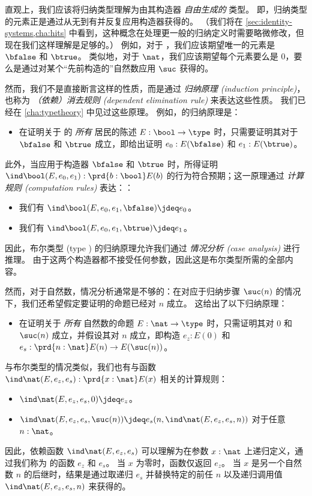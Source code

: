 %
直观上，我们应该将归纳类型理解为由其构造器 \emph{自由生成的} 类型。
即，归纳类型的元素正是通过从无到有并反复应用构造器获得的。
（我们将在 \cref{sec:identity-systems,cha:hits} 中看到，这种概念在处理更一般的归纳定义时需要略微修改，但现在我们这样理解是足够的。）
例如，对于 \bool，我们应该期望唯一的元素是 $\bfalse$ 和 $\btrue$。
类似地，对于 $\nat$，我们应该期望每个元素要么是 $0$，要么是通过对某个“先前构造的”自然数应用 $\suc$ 获得的。

%
然而，我们不是直接断言这样的性质，而是通过 \emph{归纳原理 (induction principle)}，也称为 \emph{（依赖）消去规则 (dependent elimination rule)} 来表达这些性质。
我们已经在 \cref{cha:typetheory} 中见过这些原理。
例如，\bool 的归纳原理是：
%
\begin{itemize}
    \item 在证明关于 \bool 的 \emph{所有} 居民的陈述 $E : \bool \to \type$ 时，只需要证明其对于 $\bfalse$ 和 $\btrue$ 成立，即给出证明 $e_0 : E(\bfalse)$ 和 $e_1 : E(\btrue)$。
\end{itemize}

此外，当应用于构造器 $\bfalse$ 和 $\btrue$ 时，所得证明 $\ind\bool(E,e_0,e_1): \prd{b : \bool}E(b)$ 的行为符合预期；这一原理通过 \emph{计算规则 (computation rules)} 表达：：
\begin{itemize}
    \item 我们有 $\ind\bool(E,e_0,e_1,\bfalse) \jdeq e_0$。
    \item 我们有 $\ind\bool(E,e_0,e_1,\btrue) \jdeq e_1$。
\end{itemize}

%
因此，布尔类型 (type \bool) 的归纳原理允许我们通过 \emph{情况分析 (case analysis)} 进行推理。
由于这两个构造器都不接受任何参数，因此这是布尔类型所需的全部内容。

%
然而，对于自然数，情况分析通常是不够的：在对应于归纳步骤 $\suc(n)$ 的情况下，我们还希望假定要证明的命题已经对 $n$ 成立。
这给出了以下归纳原理：
\begin{itemize}
    \item 在证明关于 \emph{所有} 自然数的命题 $E : \nat \to \type$ 时，只需证明其对 $0$ 和 $\suc(n)$ 成立，并假设其对 $n$ 成立，即构造 $e_z : E(0)$ 和 $e_s : \prd{n : \nat} E(n) \to E(\suc(n))$。
\end{itemize}
与布尔类型的情况类似，我们也有与函数 $\ind\nat(E,e_z,e_s) : \prd{x:\nat} E(x)$ 相关的计算规则：
%
\begin{itemize}
    \item $\ind\nat(E,e_z,e_s,0) \jdeq e_z$。
    \item $\ind\nat(E,e_z,e_s,\suc(n)) \jdeq e_s(n,\ind\nat(E,e_z,e_s,n))$ 对于任意 $n : \nat$。
\end{itemize}
因此，依赖函数 $\ind\nat(E,e_z,e_s)$ 可以理解为在参数 $x : \nat$ 上递归定义，通过我们称为  的函数 $e_z$ 和 $e_s$。
当 $x$ 为零时，函数仅返回 $e_z$。
当 $x$ 是另一个自然数 $n$ 的后继时，结果是通过取递归 $e_s$ 并替换特定的前任 $n$ 以及递归调用值 $\ind\nat(E,e_z,e_s,n)$ 来获得的。

